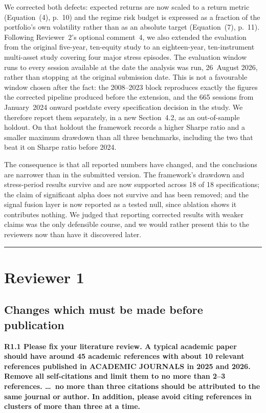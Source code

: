 \documentclass[11pt,a4paper]{article}
\newcommand{\rc}[1]{\par\medskip\noindent\textbf{#1}\par\nopagebreak}
\begin{document}
We corrected both defects: expected returns are now scaled to a return metric
(Equation~(4), p.~10) and the regime risk budget is expressed as a fraction of the
portfolio's own volatility rather than as an absolute target (Equation~(7), p.~11).
Following Reviewer~2's optional comment~4, we also extended the evaluation from the
original five-year, ten-equity study to an eighteen-year, ten-instrument multi-asset
study covering four major stress episodes. The evaluation window runs to every session
available at the date the analysis was run, 26~August 2026, rather than stopping at the
original submission date. This is not a favourable window chosen after the fact: the
2008--2023 block reproduces exactly the figures the corrected pipeline produced before
the extension, and the 665 sessions from January~2024 onward postdate every
specification decision in the study. We therefore report them separately, in a new
Section~4.2, as an out-of-sample holdout. On that holdout the framework records a higher
Sharpe ratio and a smaller maximum drawdown than all three benchmarks, including the two
that beat it on Sharpe ratio before 2024.

The consequence is that all reported numbers have changed, and the conclusions are
narrower than in the submitted version. The framework's drawdown and stress-period
results survive and are now supported across 18 of 18 specifications; the claim of
significant alpha does not survive and has been removed; and the signal fusion layer is
now reported as a tested null, since ablation shows it contributes nothing. We judged
that reporting corrected results with weaker claims was the only defensible course, and
we would rather present this to the reviewers now than have it discovered later.

\bigskip
\hrule
\section*{Reviewer 1}

\subsection*{Changes which must be made before publication}

\rc{R1.1 Please fix your literature review. A typical academic paper should have around
45 academic references with about 10 relevant references published in ACADEMIC JOURNALS
in 2025 and 2026. Remove all self-citations and limit them to no more than 2--3
references. \dots\ no more than three citations should be attributed to the same journal
or author. In addition, please avoid citing references in clusters of more than three at
a time.}
\end{document}
